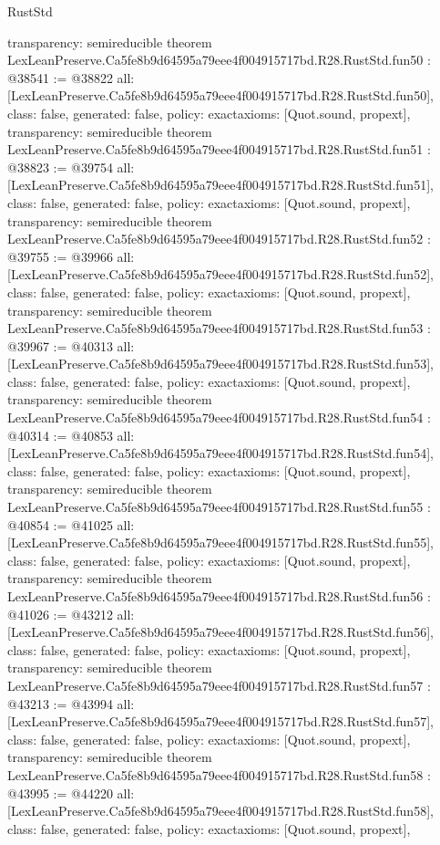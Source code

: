 \begin{lexlean}{RustStd}
\begin{coremodule}
{  transparency: semireducible
}
theorem LexLeanPreserve.Ca5fe8b9d64595a79eee4f004915717bd.R28.RustStd.fun50 : @38541 := @38822 {
  all: [LexLeanPreserve.Ca5fe8b9d64595a79eee4f004915717bd.R28.RustStd.fun50],
  class: false,
  generated: false,
  policy: exact{axioms: [Quot.sound, propext]},
  transparency: semireducible
}
theorem LexLeanPreserve.Ca5fe8b9d64595a79eee4f004915717bd.R28.RustStd.fun51 : @38823 := @39754 {
  all: [LexLeanPreserve.Ca5fe8b9d64595a79eee4f004915717bd.R28.RustStd.fun51],
  class: false,
  generated: false,
  policy: exact{axioms: [Quot.sound, propext]},
  transparency: semireducible
}
theorem LexLeanPreserve.Ca5fe8b9d64595a79eee4f004915717bd.R28.RustStd.fun52 : @39755 := @39966 {
  all: [LexLeanPreserve.Ca5fe8b9d64595a79eee4f004915717bd.R28.RustStd.fun52],
  class: false,
  generated: false,
  policy: exact{axioms: [Quot.sound, propext]},
  transparency: semireducible
}
theorem LexLeanPreserve.Ca5fe8b9d64595a79eee4f004915717bd.R28.RustStd.fun53 : @39967 := @40313 {
  all: [LexLeanPreserve.Ca5fe8b9d64595a79eee4f004915717bd.R28.RustStd.fun53],
  class: false,
  generated: false,
  policy: exact{axioms: [Quot.sound, propext]},
  transparency: semireducible
}
theorem LexLeanPreserve.Ca5fe8b9d64595a79eee4f004915717bd.R28.RustStd.fun54 : @40314 := @40853 {
  all: [LexLeanPreserve.Ca5fe8b9d64595a79eee4f004915717bd.R28.RustStd.fun54],
  class: false,
  generated: false,
  policy: exact{axioms: [Quot.sound, propext]},
  transparency: semireducible
}
theorem LexLeanPreserve.Ca5fe8b9d64595a79eee4f004915717bd.R28.RustStd.fun55 : @40854 := @41025 {
  all: [LexLeanPreserve.Ca5fe8b9d64595a79eee4f004915717bd.R28.RustStd.fun55],
  class: false,
  generated: false,
  policy: exact{axioms: [Quot.sound, propext]},
  transparency: semireducible
}
theorem LexLeanPreserve.Ca5fe8b9d64595a79eee4f004915717bd.R28.RustStd.fun56 : @41026 := @43212 {
  all: [LexLeanPreserve.Ca5fe8b9d64595a79eee4f004915717bd.R28.RustStd.fun56],
  class: false,
  generated: false,
  policy: exact{axioms: [Quot.sound, propext]},
  transparency: semireducible
}
theorem LexLeanPreserve.Ca5fe8b9d64595a79eee4f004915717bd.R28.RustStd.fun57 : @43213 := @43994 {
  all: [LexLeanPreserve.Ca5fe8b9d64595a79eee4f004915717bd.R28.RustStd.fun57],
  class: false,
  generated: false,
  policy: exact{axioms: [Quot.sound, propext]},
  transparency: semireducible
}
theorem LexLeanPreserve.Ca5fe8b9d64595a79eee4f004915717bd.R28.RustStd.fun58 : @43995 := @44220 {
  all: [LexLeanPreserve.Ca5fe8b9d64595a79eee4f004915717bd.R28.RustStd.fun58],
  class: false,
  generated: false,
  policy: exact{axioms: [Quot.sound, propext]},
}
\end{coremodule}
\end{lexlean}
